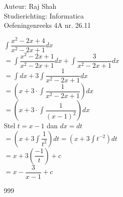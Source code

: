 \documentclass[a4paper]{article}
\begin{document}
  
\noindent \large Auteur: Raj Shah \\
\noindent \large Studierichting: Informatica\\
\noindent \large Oefeningenreeks 4A nr. 26.11\\

\medskip

\normalsize

$\displaystyle\int \dfrac{x^2 -2x +4}{x^2 -2x +1}dx$\\

$ = \displaystyle\int \dfrac{x^2 -2x +1}{x^2 -2x +1}dx + \displaystyle\int \dfrac{3}{x^2 -2x +1}dx$\\

$ = \displaystyle\int dx + 3\displaystyle\int \dfrac{1}{x^2 -2x +1}dx$\\

$ = \left(x + 3\cdot \displaystyle\int \dfrac{1}{x^2 -2x +1}\right) dx$\\

$ = \left(x + 3\cdot \displaystyle\int \dfrac{1}{(x-1)^2}\right) dx$\\

Stel $t = x-1$ dan $dx = dt$\\

$ = \left(x+3\displaystyle\int \dfrac{1}{t^2}\right)dt = \left(x+3\displaystyle\int t^{-2} \right)dt$\\

$ = x + 3 \left(\dfrac{-1}{t}\right) +c $\\

$ = x - \dfrac{3}{x-1} + c$\\







\begin{thebibliography}{999}
\end{thebibliography}
\end{document}
